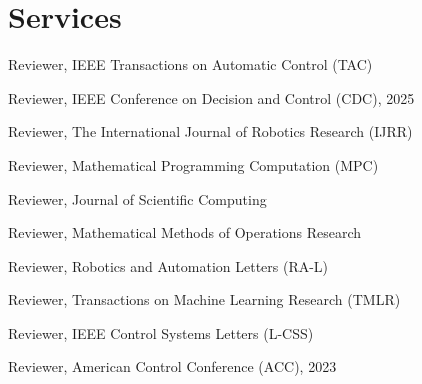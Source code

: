
\section{\mysidestyle Services}

Reviewer, IEEE Transactions on Automatic Control (TAC)

Reviewer, IEEE Conference on Decision and Control (CDC), 2025

Reviewer, The International Journal of Robotics Research (IJRR)

Reviewer, Mathematical Programming Computation (MPC)

Reviewer, Journal of Scientific Computing 

Reviewer, Mathematical Methods of Operations Research

Reviewer, Robotics and Automation Letters (RA-L)

Reviewer, Transactions on Machine Learning Research (TMLR) 

Reviewer, IEEE Control Systems Letters (L-CSS)

Reviewer, American Control Conference (ACC), 2023








